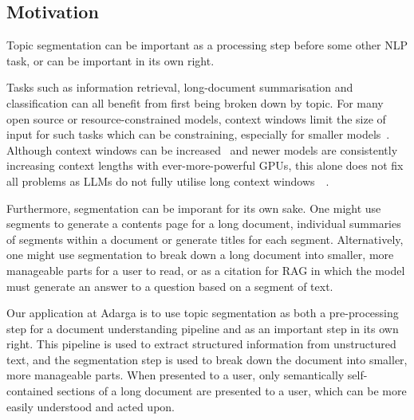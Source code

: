 \subsection{Motivation}

Topic segmentation can be important as a processing step before some other NLP task, or can be important in its own right. 

Tasks such as information retrieval, long-document summarisation and classification can all benefit from first being broken down by topic. For many open source or resource-constrained models, context windows limit the size of input for such tasks which can be constraining, especially for smaller models~\cite{FlanT5}. Although context windows can be increased~\cite{ExtendingContextWindows} and newer models are consistently increasing context lengths with ever-more-powerful GPUs, this alone does not fix all problems as LLMs do not fully utilise long context windows~\cite{EffectOfLongContextWindows}~\cite{ContextAffectsFactual}. 

Furthermore, segmentation can be imporant for its own sake. One might use segments to generate a contents page for a long document, individual summaries of segments within a document or generate titles for each segment. Alternatively, one might use segmentation to break down a long document into smaller, more manageable parts for a user to read, or as a citation for RAG in which the model must generate an answer to a question based on a segment of text.

Our application at Adarga is to use topic segmentation as both a pre-processing step for a document understanding pipeline and as an important step in its own right. This pipeline is used to extract structured information from unstructured text, and the segmentation step is used to break down the document into smaller, more manageable parts. When presented to a user, only semantically self-contained sections of a long document are presented to a user, which can be more easily understood and acted upon.
